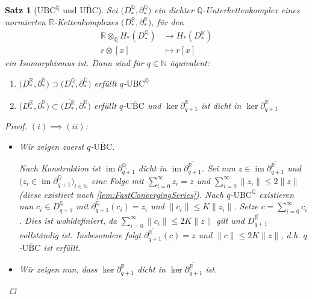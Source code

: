 \documentclass[a4paper,twoside,10pt]{scrreprt}
\DeclareMathOperator{\img}{im}
\newcommand{\UBC}{\text{UBC}}
\newcommand{\N}{\mathbb{N}}
\newcommand{\Q}{\mathbb{Q}}
\newcommand{\R}{\mathbb{R}}
\newtheorem{satz}{Satz}[section]
\theoremstyle{definition}
\begin{document}
\begin{satz}[$\UBC^{\Q}$ und $\overline{\UBC}$]\label{satz:UBCandDenseQSubcomplexes}
Sei $\bigl(D_*^{\Q},\partial_*^{\Q}\bigr)$ ein dichter $\Q$-Unterkettenkomplex eines normierten $\R$-Kettenkomplexes $\bigl(D_*^{\R},\partial_*^{\R}\bigr)$, für den
\begin{align*}
\R\otimes_{\Q}H_*(D_*^{\Q})&\to H_*(D_*^{\R})\\
r\otimes [x] &\mapsto r[x]
\end{align*}
ein Isomorphismus ist. Dann sind für $q\in\N$ äquivalent:
\renewcommand{\labelenumi}{(\roman{enumi})}%
\begin{enumerate}
\item $\bigl(D_*^{\R},\partial_*^{\R}\bigr)\supset \bigl(D_*^{\Q},\partial_*^{\Q}\bigr)$ erfüllt $q$-$\text{UBC}^{\Q}$
\item $\bigl(D_*^{\R},\partial_*^{\R}\bigr)\subset\bigl(\overline{D_*^{\R}},\overline{\partial_*^{\R}}\bigr)$ erfüllt $q$-$\overline{\text{UBC}}$ und $\ker \partial_{q+1}^{\R}$ ist dicht in $\ker \overline{\partial_{q+1}^{\R}}$
\end{enumerate}
\begin{proof}
$(i)\implies (ii)$:\par
\begin{itemize}
\item Wir zeigen zuerst $q$-$\overline{\UBC}$.\par
Nach Konstruktion ist $\img \partial_{q+1}^{\Q}$ dicht in $\img \overline{\partial_{q+1}^{\R}}$. Sei nun $z\in \img \overline{\partial_{q+1}^{\R}}$ und $\bigl(z_i\in \img \partial_{q+1}^{\Q}\bigr)_{i\in \N}$ eine Folge mit $\sum\limits_{i=0}^{\infty}z_i=z$ und $\sum\limits_{i=0}^{\infty}\|z_i\|\leq 2\|z\|$ (diese existiert nach \cref{lem:FastConvergingSeries}). 
Nach $q$-$\UBC^{\Q}$ existieren nun $c_i\in D_{q+1}^{\Q}$ mit $\partial_{q+1}^{\Q}(c_i)=z_i$ und $\|c_i\|\leq K\|z_i\|$. Setze $c=\sum\limits_{i=0}^{\infty}c_i$. Dies ist wohldefiniert, da $\sum\limits_{i=0}^{\infty}\|c_i\|\leq 2K\|z\|$ gilt und $\overline{D_{q+1}^{\R}}$ vollständig ist. Insbesondere folgt $\overline{\partial_{q+1}^{\R}}(c)=z$ und $\|c\|\leq 2K\|z\|$, d.h. $q$-$\overline{\UBC}$ ist erfüllt.\par
\item Wir zeigen nun, dass $\ker \partial_{q+1}^{\R}$ dicht in $\ker \overline{\partial_{q+1}^{\R}}$ ist.\par

\end{itemize}
\end{proof}
\end{satz}
\end{document}
